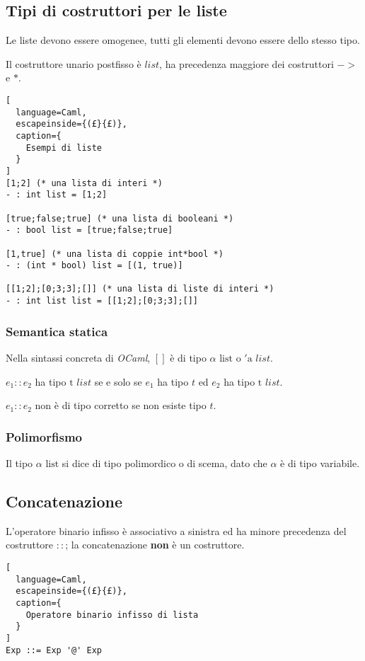 \subsection{Tipi di costruttori per le liste}
Le liste devono essere omogenee, tutti gli elementi devono essere dello stesso
tipo.


Il costruttore unario postfisso è $list$, ha precedenza maggiore dei
costruttori $->$ e $*$.

\begin{lstlisting}[
  language=Caml,
  escapeinside={(£}{£)},
  caption={
    Esempi di liste
  }
]
[1;2] (* una lista di interi *)
- : int list = [1;2]

[true;false;true] (* una lista di booleani *)
- : bool list = [true;false;true]

[1,true] (* una lista di coppie int*bool *)
- : (int * bool) list = [(1, true)]

[[1;2];[0;3;3];[]] (* una lista di liste di interi *)
- : int list list = [[1;2];[0;3;3];[]]
\end{lstlisting}

\subsubsection{Semantica statica}
Nella sintassi concreta di \emph{OCaml}, $[]$ è di tipo $\alpha\text{ list}$ o
$' \text{a } list$.

$e_1::e_2$ ha tipo $\text{t }list$ se e solo se $e_1$ ha tipo $t$ ed $e_2$ ha
tipo $\text{t }list$.

$e_1::e_2$ non è di tipo corretto se non esiste tipo $t$.

\subsubsection{Polimorfismo}
Il tipo $\alpha \text{ list}$ si dice di tipo polimordico o di scema, dato che
$\alpha$ è di tipo variabile.

\subsection{Concatenazione}
L'operatore binario infisso è associativo a sinistra ed ha minore precedenza
del costruttore $::$; la concatenazione \textbf{non} è un costruttore.
\begin{lstlisting}[
  language=Caml,
  escapeinside={(£}{£)},
  caption={
    Operatore binario infisso di lista
  }
]
Exp ::= Exp '@' Exp
\end{lstlisting}

